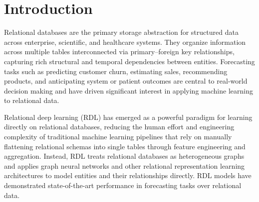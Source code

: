 \documentclass{article} %
\begin{document}
\section{Introduction} \label{sec:intro}
Relational databases are the primary storage abstraction for structured data across enterprise, scientific, and healthcare systems. They organize information across multiple tables interconnected via primary–foreign key relationships, capturing rich structural and temporal dependencies between entities. Forecasting tasks such as predicting customer churn, estimating sales, recommending products, and anticipating system or patient outcomes are central to real-world decision making and have driven significant interest in applying machine learning to relational data. 



Relational deep learning (RDL) \citep{relbench, rdl} has emerged as a powerful paradigm for learning directly on relational databases, reducing the human effort and engineering complexity of traditional machine learning pipelines that rely on manually flattening relational schemas into single tables through feature engineering and aggregation. Instead, RDL treats relational databases as heterogeneous graphs and applies graph neural networks \citep{relbench,chen2025relgnn} and other relational representation learning architectures \citep{dwivedi2025relational,dwivedi2025relational2} to model entities and their relationships directly. RDL models have demonstrated state-of-the-art performance in forecasting tasks over relational data.

\end{document}
